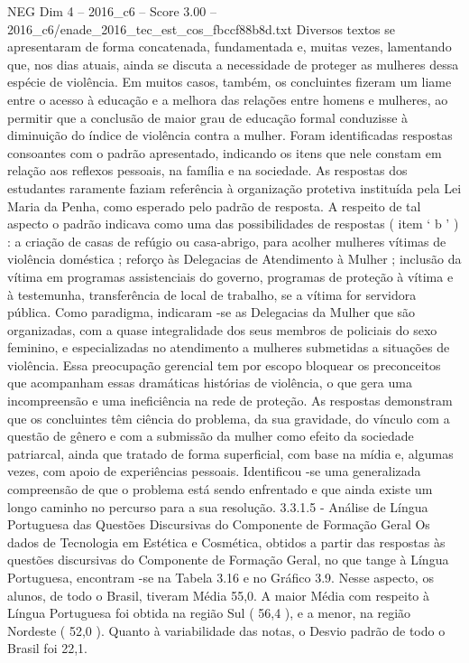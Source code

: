 \begin{textsample}{NEG Dim 4 – 2016\_c6 – Score 3.00 – 2016\_c6/enade\_2016\_tec\_est\_cos\_fbccf88b8d.txt}
Diversos textos se apresentaram de forma concatenada, fundamentada e, muitas vezes, lamentando que, nos dias atuais, ainda se discuta a necessidade de proteger as mulheres dessa espécie de violência.
Em muitos casos, também, os concluintes fizeram um liame entre o acesso à educação e a melhora das relações entre homens e mulheres, ao permitir que a conclusão de maior grau de educação formal conduzisse à diminuição do índice de violência contra a mulher.
Foram identificadas respostas consoantes com o padrão apresentado, indicando os itens que nele constam em relação aos reflexos pessoais, na família e na sociedade.
As respostas dos estudantes raramente faziam referência à organização protetiva instituída pela Lei Maria da Penha, como esperado pelo padrão de resposta.
A respeito de tal aspecto o padrão indicava como uma das possibilidades de respostas ( item ‘ b ’ ) : a criação de casas de refúgio ou casa-abrigo, para acolher mulheres vítimas de violência doméstica ; reforço às Delegacias de Atendimento à Mulher ; inclusão da vítima em programas assistenciais do governo, programas de proteção à vítima e à testemunha, transferência de local de trabalho, se a vítima for servidora pública.
Como paradigma, indicaram -se as Delegacias da Mulher que são organizadas, com a quase integralidade dos seus membros de policiais do sexo feminino, e especializadas no atendimento a mulheres submetidas a situações de violência.
Essa preocupação gerencial tem por escopo bloquear os preconceitos que acompanham essas dramáticas histórias de violência, o que gera uma incompreensão e uma ineficiência na rede de proteção.
As respostas demonstram que os concluintes têm ciência do problema, da sua gravidade, do vínculo com a questão de gênero e com a submissão da mulher como efeito da sociedade patriarcal, ainda que tratado de forma superficial, com base na mídia e, algumas vezes, com apoio de experiências pessoais.
Identificou -se uma generalizada compreensão de que o problema está sendo enfrentado e que ainda existe um longo caminho no percurso para a sua resolução. 3.3.1.5 - Análise de Língua Portuguesa das Questões Discursivas do Componente de Formação Geral Os dados de Tecnologia em Estética e Cosmética, obtidos a partir das respostas às questões discursivas do Componente de Formação Geral, no que tange à Língua Portuguesa, encontram -se na Tabela 3.16 e no Gráfico 3.9.
Nesse aspecto, os alunos, de todo o Brasil, tiveram Média 55,0.
A maior Média com respeito à Língua Portuguesa foi obtida na região Sul ( 56,4 ), e a menor, na região Nordeste ( 52,0 ).
Quanto à variabilidade das notas, o Desvio padrão de todo o Brasil foi 22,1.

\end{textsample}
